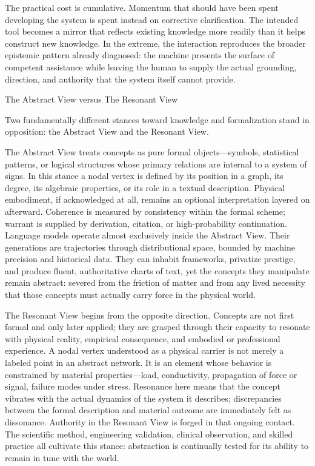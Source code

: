 The practical cost is cumulative. Momentum that should have been spent developing the system is spent instead on corrective clarification. The intended tool becomes a mirror that reflects existing knowledge more readily than it helps construct new knowledge. In the extreme, the interaction reproduces the broader epistemic pattern already diagnosed: the machine presents the surface of competent assistance while leaving the human to supply the actual grounding, direction, and authority that the system itself cannot provide.

The Abstract View versus The Resonant View

Two fundamentally different stances toward knowledge and formalization stand in opposition: the Abstract View and the Resonant View.

The Abstract View treats concepts as pure formal objects—symbols, statistical patterns, or logical structures whose primary relations are internal to a system of signs. In this stance a nodal vertex is defined by its position in a graph, its degree, its algebraic properties, or its role in a textual description. Physical embodiment, if acknowledged at all, remains an optional interpretation layered on afterward. Coherence is measured by consistency within the formal scheme; warrant is supplied by derivation, citation, or high-probability continuation. Language models operate almost exclusively inside the Abstract View. Their generations are trajectories through distributional space, bounded by machine precision and historical data. They can inhabit frameworks, privatize prestige, and produce fluent, authoritative charts of text, yet the concepts they manipulate remain abstract: severed from the friction of matter and from any lived necessity that those concepts must actually carry force in the physical world.

The Resonant View begins from the opposite direction. Concepts are not first formal and only later applied; they are grasped through their capacity to resonate with physical reality, empirical consequence, and embodied or professional experience. A nodal vertex understood as a physical carrier is not merely a labeled point in an abstract network. It is an element whose behavior is constrained by material properties—load, conductivity, propagation of force or signal, failure modes under stress. Resonance here means that the concept vibrates with the actual dynamics of the system it describes; discrepancies between the formal description and material outcome are immediately felt as dissonance. Authority in the Resonant View is forged in that ongoing contact. The scientific method, engineering validation, clinical observation, and skilled practice all cultivate this stance: abstraction is continually tested for its ability to remain in tune with the world.

